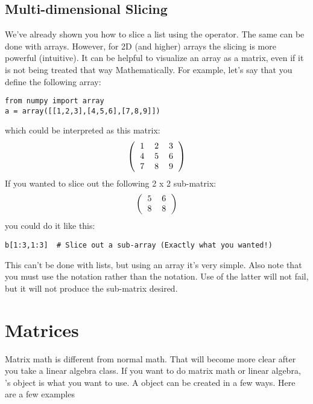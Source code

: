 \subsection*{Multi-dimensional Slicing}
We've already shown you how to slice a list using the \code{:}
operator.  The same can be done with arrays.  However, for 2D (and
higher) arrays the slicing is more powerful (intuitive).  It can be
helpful to visualize an array as a matrix, even if it is not being
treated that way Mathematically.  For example, let's say that you
define the following array:
\begin{Verbatim}
from numpy import array
a = array([[1,2,3],[4,5,6],[7,8,9]])
\end{Verbatim}
which could be interpreted as this matrix:
\begin{equation}
\left( \begin{tabular}{ccc}
1 & 2 & 3\\
4 & 5 & 6\\
7 & 8 & 9\\
\end{tabular}
\right)
\end{equation}
If you wanted to slice out the following 2 x 2 sub-matrix:
\begin{equation}
\left(\begin{tabular}{cc}
5 & 6 \\
8 & 8 \\
\end{tabular}
\right)
\end{equation}
you could do it like this:
\begin{Verbatim}
b[1:3,1:3]  # Slice out a sub-array (Exactly what you wanted!)
\end{Verbatim}
This can't be done with lists, but using an array it's very simple.
Also note that you must use the \code{[x1:y1,x2:y2]} notation rather
than the \code{[x1:y1][x2:y2]} notation.  Use of the latter will not
fail, but it will not produce the sub-matrix desired.
\section{Matrices}
Matrix math is different from normal math.  That will become more
clear after you take a linear algebra class.  If you want to do matrix
math or linear algebra, 's  object is what you
want to use.  A  object can be created in a few ways.  Here are
a few examples


